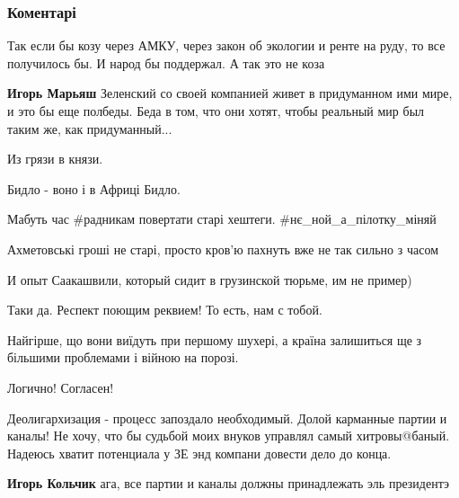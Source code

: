  
 
 
 
 
\subsubsection{Коментарі}
\label{sec:25_11_2021.fb.valetov_jan.dnepropetrovsk.1.nuvorish.cmt}

\begin{itemize} %
Так если бы козу через АМКУ, через закон об экологии и ренте на руду, то все получилось бы. И народ бы поддержал.
А так это не коза

\textbf{Игорь Марьяш} Зеленский со своей компанией живет в придуманном ими мире, и это бы еще полбеды. Беда в том, что они хотят, чтобы реальный мир был таким же, как придуманный...

Из грязи в князи.

Бидло - воно і в Африці Бидло.

Мабуть час \#радникам повертати старі хештеги.
\#нє\_ной\_а\_пілотку\_міняй

Ахметовські гроші не старі, просто кров'ю пахнуть вже не так сильно з часом

И опыт Саакашвили, который сидит в грузинской тюрьме, им не пример)


Таки да. Респект поющим реквием! То есть, нам с тобой.

Найгірше, що вони виїдуть при першому шухері, а країна залишиться ще з більшими проблемами і війною на порозі.

Логично! Согласен!


Деолигархизация - процесс запоздало необходимый. Долой карманные партии и
каналы! Не хочу, что бы судьбой моих внуков управлял самый хитровы@баный.
Надеюсь хватит потенциала у ЗЕ энд компани довести дело до конца.

\begin{itemize} %
\textbf{Игорь Кольчик} ага, все партии и каналы должны принадлежать эль президентэ


\end{itemize}
\end{itemize}
